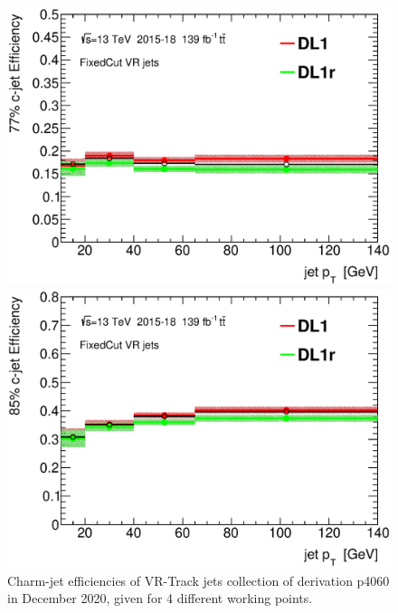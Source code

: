 \documentclass[letterpaper,12pt]{article}
\begin{document}
\begin{figure}[H]
\begin{minipage}[b]{.45\textwidth}
\includegraphics[width=1\textwidth]{SFplots_december/DL1allVRJetsDec_DL1rallVRJetsDec/eff77.eps}
\end{minipage}\hfill
\begin{minipage}[b]{.45\textwidth}
\centering
\includegraphics[width=1\textwidth]{SFplots_december/DL1allVRJetsDec_DL1rallVRJetsDec/eff85.eps}
\end{minipage}
\caption{Charm-jet efficiencies of VR-Track jets collection of derivation 
p4060 in December 2020, given for 4 different working points.} \label{fig:Dec_eff_VRJets}
\end{figure}

\end{document}
